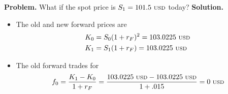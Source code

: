 \documentclass{beamer}
\begin{document}
\begin{frame}{}
	\textbf{Problem.} What if the spot price is $S_{1}=101.5\text{ {\scriptsize USD}}$ today?
	\vfill
	\textbf{Solution.}
    \begin{itemize}
		\item The old and new forward prices are 
            \begin{align}
				K_{0}&=S_{0}(1+r_{F})^{2}=103.0225\text{ {\scriptsize USD}}\\
				K_{1}&=S_{1}(1+r_{F})=103.0225\text{ {\scriptsize USD}}
            \end{align}
        \item The old forward trades for
            \begin{equation}\small
				f_{0}=\frac{K_{1}-K_{0}}{1+r_{F}}=\frac{103.0225\text{ {\scriptsize USD}}-103.0225\text{ {\scriptsize USD}}}{1+.015}=0\text{ {\scriptsize USD}}
            \end{equation}
    \end{itemize}
\end{frame}
\end{document}
